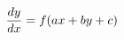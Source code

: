 \documentclass[preview]{standalone}
\begin{document}
\begin{align*}
\special{dvisvgm:raw <g id='unique000'>}\frac{dy}{dx} = f(ax + by + c)\special{dvisvgm:raw </g>}
\end{align*}
\end{document}
